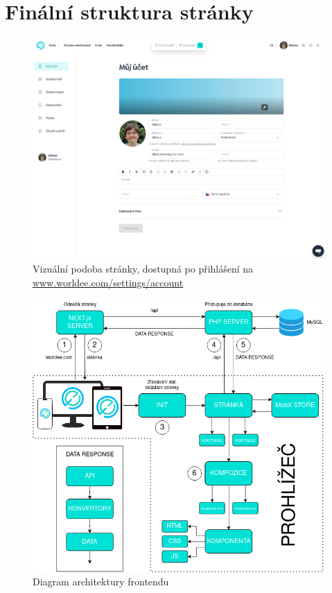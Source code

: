 \section{Finální struktura stránky}

\begin{figure}[h!]
    \centering
    \includegraphics[width=1\linewidth]{obrazky/finalni_stranka.png}
    \caption[Vizuální podoba stránky]{Vizuální podoba stránky, dostupná po přihlášení na \\\href{https://www.worldee.com/cz/settings/account}{www.worldee.com/settings/account}}
\end{figure}

\begin{figure}
    \centering
    \includegraphics[width=1\linewidth]{obrazky/architektura.png}
    \caption{Diagram architektury frontendu}
\end{figure}